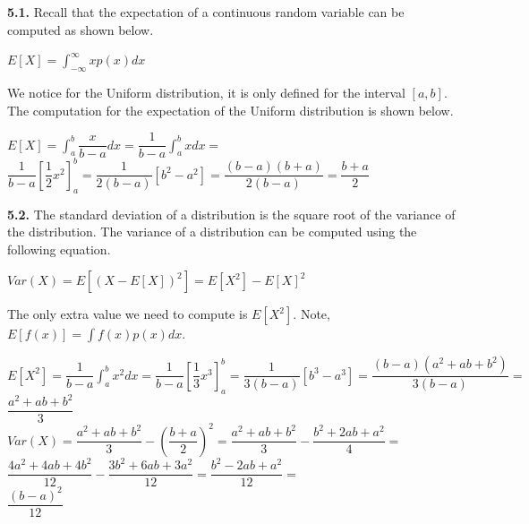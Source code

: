 \documentclass[12pt]{article}
\begin{document}
{\bf 5.1.} Recall that the expectation of a continuous random variable can be computed as shown below.

\begin{center}

$E[X]=\displaystyle \int_{-\infty}^{\infty}xp(x)dx$\\

\end{center}

We notice for the Uniform distribution, it is only defined for the interval $[a,b]$. The computation for the expectation of the Uniform distribution is shown below.

\begin{center}

$E[X]=\displaystyle \int_{a}^{b}\dfrac{x}{b-a}dx=\dfrac{1}{b-a}\displaystyle \int_{a}^{b}xdx=$\\
\bigskip
$\dfrac{1}{b-a}[\dfrac{1}{2}x^{2}]_{a}^{b}=\dfrac{1}{2(b-a)}[b^{2}-a^{2}]=\dfrac{(b-a)(b+a)}{2(b-a)}=\dfrac{b+a}{2}$\\

\end{center}

{\bf 5.2.} The standard deviation of a distribution is the square root of the variance of the distribution. The variance of a distribution can be computed using the following equation.

\begin{center}

$Var(X)=E[(X-E[X])^{2}]=E[X^{2}]-E[X]^{2}$\\

\end{center}

The only extra value we need to compute is $E[X^{2}]$. Note, $E[f(x)]=\displaystyle\int f(x)p(x)dx$.

\begin{center}

$E[X^{2}]=\dfrac{1}{b-a}\displaystyle\int_{a}^{b}x^{2}dx=\dfrac{1}{b-a}[\dfrac{1}{3}x^{3}]_{a}^{b}=\dfrac{1}{3(b-a)}[b^{3}-a^{3}]=\dfrac{(b-a)(a^{2}+ab+b^{2})}{3(b-a)}=$\\
\bigskip
$\dfrac{a^{2}+ab+b^{2}}{3}$\\
\bigskip
$Var(X)=\dfrac{a^{2}+ab+b^{2}}{3}-(\dfrac{b+a}{2})^{2}=\dfrac{a^{2}+ab+b^{2}}{3}-\dfrac{b^{2}+2ab+a^{2}}{4}=$\\
\bigskip
$\dfrac{4a^{2}+4ab+4b^{2}}{12}-\dfrac{3b^{2}+6ab+3a^{2}}{12}=\dfrac{b^{2}-2ab+a^{2}}{12}=$\\
\bigskip
$\dfrac{(b-a)^{2}}{12}$\\

\end{center}
\end{document}
